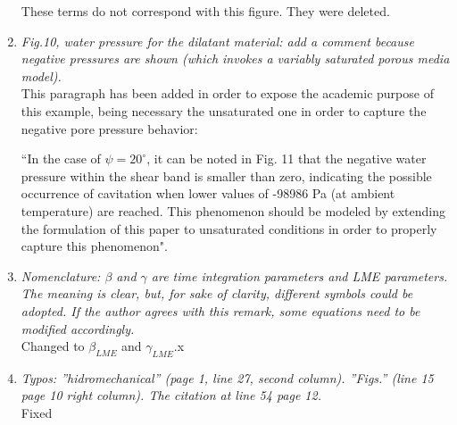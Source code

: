 \documentclass[12pt]{article}
\begin{document}
\begin{enumerate}
These terms do not correspond with this figure. They were deleted.

\item \textit{Fig.10, water pressure for the dilatant material: add a comment because negative pressures are shown (which invokes a variably saturated porous media model).}\\

This paragraph has been added in order to expose the academic purpose of this example, being necessary the unsaturated one in order to capture the negative pore pressure behavior:

``In the case of $\psi=20^\circ$, it can be noted in Fig. 11 that the negative water pressure within the shear band is smaller than zero, indicating the possible occurrence of cavitation when lower values of -98986 Pa (at ambient temperature) are reached. This phenomenon should be modeled by extending the formulation of this paper to unsaturated conditions in order to properly capture this phenomenon".

\item \textit{Nomenclature: $\beta$ and $\gamma$ are time integration parameters and LME parameters. The meaning is clear, but, for sake of clarity, different symbols could be adopted. If the author agrees with this remark, some equations need to be modified accordingly.}\\

Changed to $\beta_{LME}$ and $\gamma_{LME}$.x

\item \textit{Typos: ''hidromechanical'' (page 1, line 27, second column). ''Figs.'' (line 15 page 10 right column). The citation at line 54 page 12.}\\

Fixed

\end{enumerate}
\end{document}
